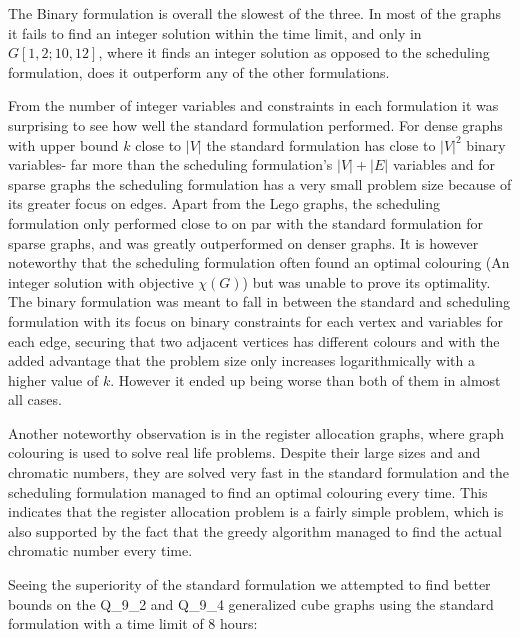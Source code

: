 \noindent The Binary formulation is overall the slowest of the three. In most of the graphs it fails to find an integer solution within the time limit, and only in $G[1,2;10,12]$, where it finds an integer solution as opposed to the scheduling formulation, does it outperform any of the other formulations.

\noindent From the number of integer variables and constraints in each formulation it was surprising to see how well the standard formulation performed. For dense graphs with upper bound $k$ close to $|V|$ the standard formulation has close to $|V|^2$ binary variables- far more than the scheduling formulation's $|V|+|E|$ variables and for sparse graphs the scheduling formulation has a very small problem size because of its greater focus on edges. Apart from the Lego graphs, the scheduling formulation only performed close to on par with the standard formulation for sparse graphs, and was greatly outperformed on denser graphs. It is however noteworthy that the scheduling formulation often found an optimal colouring (An integer solution with objective $\chi (G)$) but was unable to prove its optimality. The binary formulation was meant to fall in between the standard and scheduling formulation with its focus on binary constraints for each vertex and variables for each edge, securing that two adjacent vertices has different colours and with the added advantage that the problem size only increases logarithmically with a higher value of $k$. However it ended up being worse than both of them in almost all cases.

\noindent Another noteworthy observation is in the register allocation graphs, where graph colouring is used to solve real life problems. Despite their large sizes and and chromatic numbers, they are solved very fast in the standard formulation and the scheduling formulation managed to find an optimal colouring every time. This indicates that the register allocation problem is a fairly simple problem, which is also supported by the fact that the greedy algorithm managed to find the actual chromatic number every time.

\noindent Seeing the superiority of the standard formulation we attempted to find better bounds on the Q\_9\_2 and Q\_9\_4 generalized cube graphs using the standard formulation with a time limit of 8 hours:
\iffalse
\todo{Standard - fast,
Scheduling - medium,
Binary - slow.
Maybe a bigger number of binary variables result in tighter relaxation}
\todo{(number of variables and constraints), the tightness of the formulation (the gap between integer optimal value and the optimal value of linear relaxation)}
\fi

